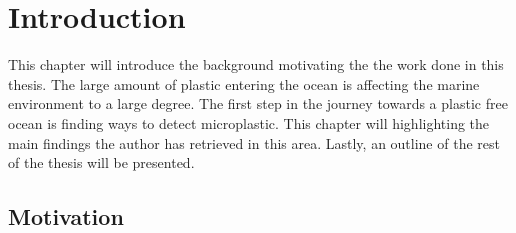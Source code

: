 \chapter{Introduction}
\label{chap:introduction}
This chapter will introduce the background motivating the the work done in this thesis. The large amount of plastic entering the ocean is affecting the marine environment to a large degree. The first step in the journey towards a plastic free ocean is finding ways to detect microplastic. This chapter will highlighting the main findings the author has retrieved in this area. Lastly, an outline of the rest of the thesis will be presented.

\section{Motivation}



